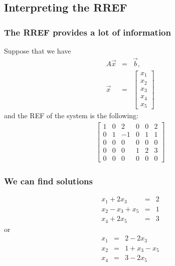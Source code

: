\subsection{Interpreting the RREF}

\begin{frame}
  \frametitle{The RREF provides a lot of information}

  Suppose that we have
  \begin{eqnarray*}
    A\vec{x} & = & \vec{b}, \\
    \vec{x} & = &
    \left[ \begin{array}{r}x_1\\x_2\\x_3\\x_4\\x_5\end{array}\right]
  \end{eqnarray*}
  and the REF of the system is the following:
  \begin{eqnarray*}
    \left[
      \begin{array}{rrrrr|r}
        1 & 0 & 2 & 0 & 0 & 2 \\
        0 & 1 & -1 & 0 & 1 & 1 \\
        0 & 0 & 0 & 0 & 0 & 0 \\
        0 & 0 & 0 & 1 & 2 & 3 \\
        0 & 0 & 0 & 0 & 0 & 0
      \end{array}
    \right]
  \end{eqnarray*}

\end{frame}


\begin{frame}
  \frametitle{We can find solutions}


  \begin{eqnarray*}
    x_1 + 2x_3 & = & 2 \\
    x_2 - x_3 + x_5 & = & 1 \\
    x_4 + 2x_5 & = & 3
  \end{eqnarray*}
  or
  \begin{eqnarray*}
    x_1  & = & 2 -  2x_3\\
    x_2  & = & 1 +  x_3 - x_5\\
    x_4  & = & 3 - 2x_5
  \end{eqnarray*}

\end{frame}

